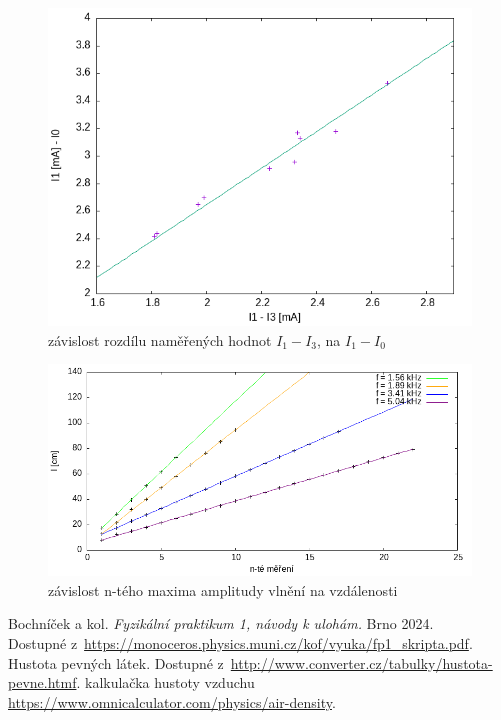 \documentclass[a4paper,11pt]{article}
\begin{document}
\begin{figure}[bp!]
  \centering
  \includegraphics[width=0.7\linewidth]{clement-cidlem.png}
  \caption{závislost rozdílu naměřených hodnot $I_1 - I_3$, na $I_1 - I_0$}
  \label{fig:3}
\end{figure}

\begin{figure}[bp!]
  \centering
  \includegraphics[width=0.9\linewidth]{vlnova_delka.png}
  \caption{závislost n-tého maxima amplitudy vlnění na vzdálenosti}
  \label{fig:4}
\end{figure}

\begin{thebibliography}{0}
 Bochníček a kol. \textit{Fyzikální praktikum 1, návody k ulohám.} Brno 2024.\\ Dostupné z~\url{https://monoceros.physics.muni.cz/kof/vyuka/fp1_skripta.pdf}.   
 Hustota pevných látek. Dostupné z~\url{http://www.converter.cz/tabulky/hustota-pevne.htmf}.   
 kalkulačka hustoty vzduchu \url{https://www.omnicalculator.com/physics/air-density}.
\end{thebibliography}
\end{document}
